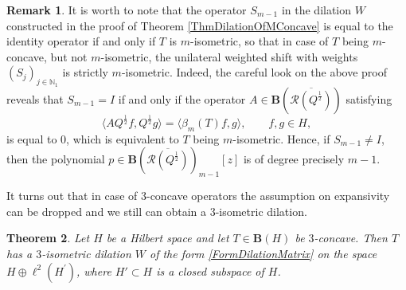 \documentclass{amsart}
\newtheorem{theorem}{Theorem}[section]
\theoremstyle{definition}
\newtheorem{remark}[theorem]{Remark}
\numberwithin{equation}{section}
\begin{document}
\begin{remark}
    It is worth to note that the operator $ S_{m-1} $ in the dilation $ W $ constructed in the proof of Theorem \ref{ThmDilationOfMConcave} is equal to the identity operator if and only if $ T $ is $ m $-isometric, so that in case of $ T $ being $ m $-concave, but not $ m $-isometric, the unilateral weighted shift with weights $ (S_{j})_{j\in \mathbb{N}_{1}} $ is strictly $ m $-isometric. Indeed, the careful look on the above proof reveals that $ S_{m-1} = I $ if and only if the operator $ A\in \mathbf{B}(\overline{\mathcal{R}(Q^{\frac{1}{2}})}) $ satisfying
    \begin{equation*}
        \langle AQ^{\frac{1}{2}}f,Q^{\frac{1}{2}}g\rangle = \langle \beta_{m}(T)f,g\rangle, \qquad f,g\in H,
    \end{equation*}
    is equal to 0, which is equivalent to $ T $ being $ m $-isometric. Hence, if $ S_{m-1}\not= I $, then the polynomial $ p\in \mathbf{B}(\overline{\mathcal{R}(Q^{\frac{1}{2}})})_{m-1}[z] $ is of degree precisely $ m-1 $.
\end{remark}
It turns out that in case of $ 3 $-concave operators the assumption on expansivity can be dropped and we still can obtain a $ 3 $-isometric dilation.
\begin{theorem}
    \label{ThmDilationOf3ConcaveWithoutExpansivity}
    Let $ H $ be a Hilbert space and let $ T\in \mathbf{B}(H) $ be $ 3 $-concave. Then $ T $ has a $ 3 $-isometric dilation $ W $ of the form \eqref{FormDilationMatrix} on the space $ H\oplus \ell^{2}(H^{\prime}) $, where $ H' \subset H $ is a closed subspace of $ H $.
\end{theorem}
\end{document}
